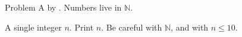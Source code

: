 \newcommand{\NN}{\mathbb{N}}
Problem A by . Numbers live in $\NN$.
A single integer $n$.
Print $n$.
Be careful with $\NN$, and with \(n \le 10\).
